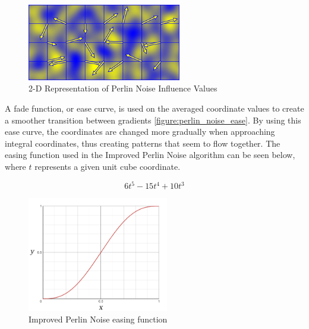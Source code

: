 \begin{figure}
    \centering
    \includegraphics[width=0.6\textwidth]{figures/body/methodology/perlin_noise_influence.png}
    \caption{2-D Representation of Perlin Noise Influence Values \cite{biagioli_2014}}
    \label{figure:perlin_noise_influence}
\end{figure}

A fade function, or ease curve, is used on the averaged coordinate values to create a smoother transition between gradients \autoref{figure:perlin_noise_ease}. By using this ease curve, the coordinates are changed more gradually when approaching integral coordinates, thus creating patterns that seem to flow together. The easing function used in the Improved Perlin Noise algorithm can be seen below, where \(t\) represents a given unit cube coordinate.

\begin{displaymath}
6t^5 - 15t^4 + 10t^3
\end{displaymath}

\begin{figure}
    \centering
    \includegraphics[width=0.55\textwidth]{figures/body/methodology/perlin_noise_ease.png}
    \caption{Improved Perlin Noise easing function}
    \label{figure:perlin_noise_ease}
\end{figure}

